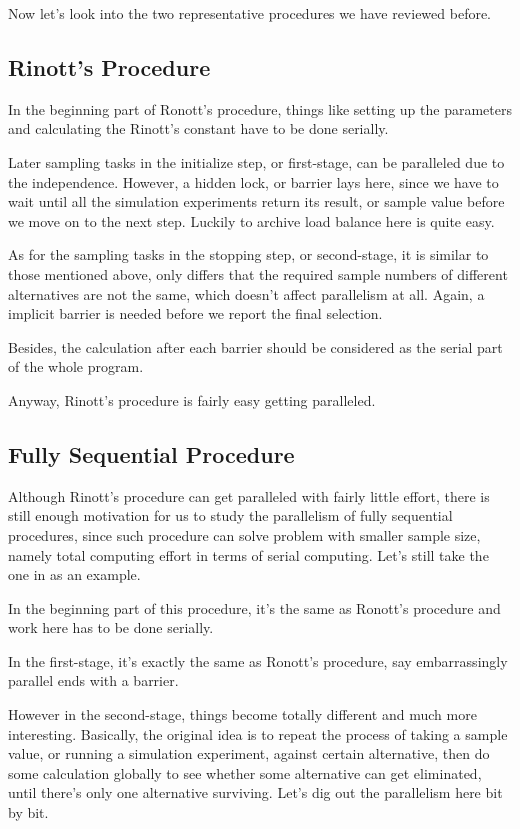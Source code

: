 \documentclass[12pt,a4paper]{report}
\begin{document}
Now let's look into the two representative procedures we have reviewed before.

\subsection{Rinott's Procedure}

In the beginning part of Ronott's procedure, things like setting up the parameters and calculating the Rinott's constant have to be done serially.

Later sampling tasks in the initialize step, or first-stage, can be paralleled due to the independence. However, a hidden lock, or barrier lays here, since we have to wait until all the simulation experiments return its result, or sample value before we move on to the next step. Luckily to archive load balance here is quite easy.

As for the sampling tasks in the stopping step, or second-stage, it is similar to those mentioned above, only differs that the required sample numbers of different alternatives are not the same, which doesn't affect parallelism at all. Again, a implicit barrier is needed before we report the final selection.

Besides, the calculation after each barrier should be considered as the serial part of the whole program.

Anyway, Rinott's procedure is fairly easy getting paralleled.

\subsection{Fully Sequential Procedure}

Although Rinott's procedure can get paralleled with fairly little effort, there is still enough motivation for us to study the parallelism of fully sequential procedures, since such procedure can solve problem with smaller sample size, namely total computing effort in terms of serial computing. Let's still take the one in \cite{ras-seq-jeff} as an example.

In the beginning part of this procedure, it's the same as Ronott's procedure and work here has to be done serially.

In the first-stage, it's exactly the same as Ronott's procedure, say embarrassingly parallel ends with a barrier.

However in the second-stage, things become totally different and much more interesting. Basically, the original idea is to repeat the process of taking a sample value, or running a simulation experiment, against certain alternative, then do some calculation globally to see whether some alternative can get eliminated, until there's only one alternative surviving. Let's dig out the parallelism here bit by bit.
\end{document}
